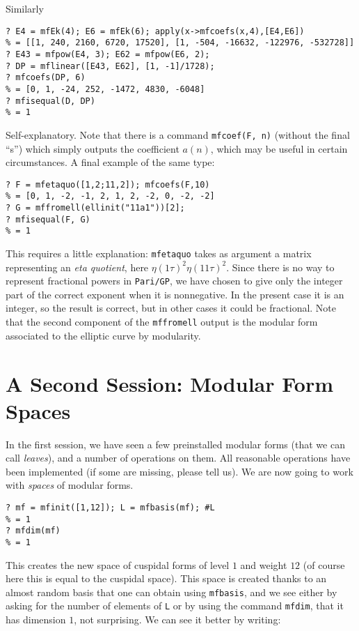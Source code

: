\documentclass[11pt]{article}
\def\kbd#1{{\tt #1}}
\begin{document}
Similarly

\begin{verbatim}
? E4 = mfEk(4); E6 = mfEk(6); apply(x->mfcoefs(x,4),[E4,E6])
% = [[1, 240, 2160, 6720, 17520], [1, -504, -16632, -122976, -532728]]
? E43 = mfpow(E4, 3); E62 = mfpow(E6, 2);
? DP = mflinear([E43, E62], [1, -1]/1728);
? mfcoefs(DP, 6)
% = [0, 1, -24, 252, -1472, 4830, -6048]
? mfisequal(D, DP)
% = 1
\end{verbatim}

Self-explanatory. Note that there is a command \kbd{mfcoef(F, n)} (without
the final ``s'') which simply outputs the coefficient $a(n)$, which may be
useful in certain circumstances. A final example of the same type:

\begin{verbatim}
? F = mfetaquo([1,2;11,2]); mfcoefs(F,10)
% = [0, 1, -2, -1, 2, 1, 2, -2, 0, -2, -2]
? G = mffromell(ellinit("11a1"))[2];
? mfisequal(F, G)
% = 1
\end{verbatim}

This requires a little explanation: \kbd{mfetaquo} takes as argument
a matrix representing an \emph{eta quotient}, here
$\eta(1\tau)^2\eta(11\tau)^2$. Since there is no way to represent fractional
powers in \kbd{Pari/GP}, we have chosen to give only the integer part
of the correct exponent when it is nonnegative. In the present case it
is an integer, so the result is correct, but in other cases it could be
fractional. Note that the second component of the \kbd{mffromell} output is
the modular form associated to the elliptic curve by modularity.

\section{A Second Session: Modular Form Spaces}

In the first session, we have seen a few preinstalled modular forms (that
we can call \emph{leaves}), and a number of operations on them. All reasonable
operations have been implemented (if some are missing, please tell us). We are
now going to work with \emph{spaces} of modular forms.

\begin{verbatim}
? mf = mfinit([1,12]); L = mfbasis(mf); #L
% = 1
? mfdim(mf)
% = 1
\end{verbatim}

This creates the new space of cuspidal forms of level $1$ and weight $12$
(of course here this is equal to the cuspidal space). This space is created
thanks to an almost random basis that one can obtain using \kbd{mfbasis},
and we see either by asking for the number of elements of \kbd{L} or by
using the command \kbd{mfdim}, that it has dimension $1$, not surprising.
We can see it better by writing:
\end{document}
